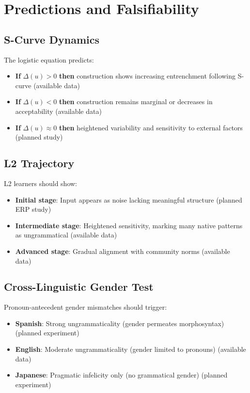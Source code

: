 \documentclass[12pt]{article}
\begin{document}
\section{Predictions and Falsifiability}

\subsection{S-Curve Dynamics}

The logistic equation predicts:
\begin{itemize}
\item \textbf{If} $\Delta(u) > 0$ \textbf{then} construction shows increasing entrenchment following S-curve (available data)
\item \textbf{If} $\Delta(u) < 0$ \textbf{then} construction remains marginal or decreases in acceptability (available data)
\item \textbf{If} $\Delta(u) \approx 0$ \textbf{then} heightened variability and sensitivity to external factors (planned study)
\end{itemize}

\subsection{L2 Trajectory}

L2 learners should show:
\begin{itemize}
\item \textbf{Initial stage}: Input appears as noise lacking meaningful structure (planned ERP study)
\item \textbf{Intermediate stage}: Heightened sensitivity, marking many native patterns as ungrammatical (available data)
\item \textbf{Advanced stage}: Gradual alignment with community norms (available data)
\end{itemize}

\subsection{Cross-Linguistic Gender Test}

Pronoun-antecedent gender mismatches should trigger:
\begin{itemize}
\item \textbf{Spanish}: Strong ungrammaticality (gender permeates morphosyntax) (planned experiment)
\item \textbf{English}: Moderate ungrammaticality (gender limited to pronouns) (available data)
\item \textbf{Japanese}: Pragmatic infelicity only (no grammatical gender) (planned experiment)
\end{itemize}
\end{document}
